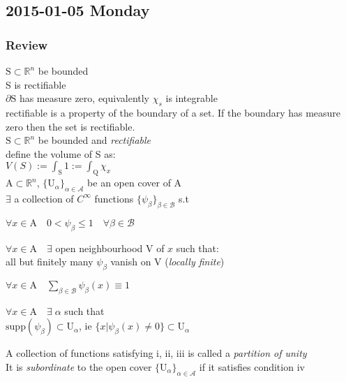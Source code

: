
\subsection{2015-01-05 Monday}
\subsubsection{Review}
\LET $\mathrm{S}\subset\mathbb{R}^n$ be bounded  \\
\THEN S is rectifiable \\
\IFF $\partial \mathrm{S}$ has measure zero, equivalently $\chi_s$ is integrable\\
\IDEA rectifiable is a property of the boundary of a set. If the boundary has measure zero then the set is rectifiable.\\

\LET $\mathrm{S}\subset\mathbb{R}^n$ be bounded and \textit{rectifiable}\\
\THEN define the volume of S as:\\
$V(S):=\int_{\mathrm{S}}1:=\int_{\mathrm{Q}}\chi_x$\\

\LET $\mathrm{A}\subset\mathbb{R}^n$,
$\{\mathrm{U}_\alpha\}_{\alpha\in\mathcal{A}}$ be an open cover of A\\
\THEN $\exists$ a collection of $C^\infty$ functions $\{\psi_\beta\}_{\beta\in\mathcal{B}}$ s.t
\begin{myenumerate}
\item $\forall x\in\mathrm{A}\quad 0<\psi_\beta\leq1\quad\forall\beta\in\mathcal{B}$
\item $\forall x\in\mathrm{A}\quad\exists$ open neighbourhood V of $x$ such that:\\
  all but finitely many $\psi_\beta$ vanish on V (\textit{locally finite})
\item $\forall x\in\mathrm{A}\quad\sum_{\beta\in\mathcal{B}}\psi_\beta(x)\equiv 1$
\item $\forall x\in\mathrm{A}\quad\exists\;\alpha$ such that\\
  $\mathrm{supp}(\psi_\beta)\subset\mathrm{U}_\alpha$, ie
  $\{x|\psi_\beta(x)\neq0\}\subset\mathrm{U}_\alpha$
\end{myenumerate}
A collection of functions satisfying i, ii, iii is called a \textit{partition of unity}\\
It is \textit{subordinate} to the open cover $\{\mathrm{U}_\alpha\}_{\alpha\in\mathcal{A}}$
if it satisfies condition iv


